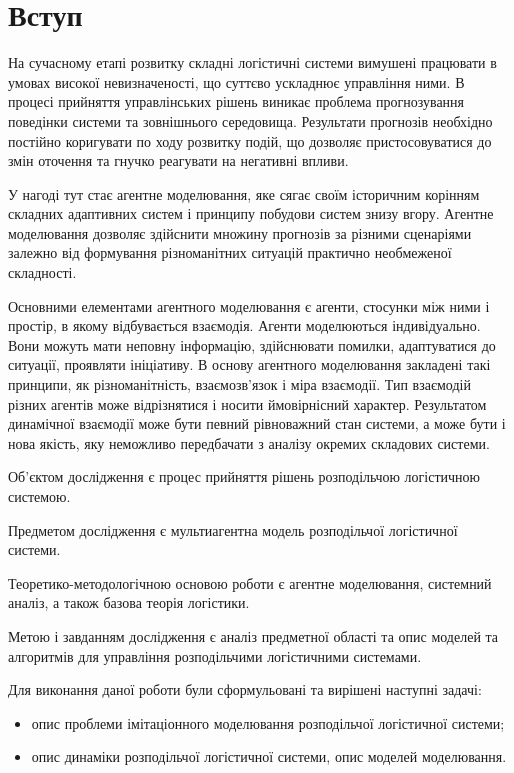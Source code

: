 \section*{Вступ}


На сучасному етапі розвитку складні логістичні системи вимушені працювати в умовах високої невизначеності, що суттєво ускладнює управління ними. 
В процесі прийняття управлінських рішень виникає проблема прогнозування поведінки системи та зовнішнього середовища. 
Результати прогнозів необхідно постійно коригувати по ходу розвитку подій, що дозволяє пристосовуватися до змін оточення та гнучко реагувати на негативні впливи. 

У нагоді тут стає агентне моделювання, яке сягає своїм історичним корінням складних адаптивних систем і принципу побудови систем знизу вгору.
Агентне моделювання дозволяє здійснити множину прогнозів за різними сценаріями залежно від формування різноманітних ситуацій практично необмеженої складності. 

Основними елементами агентного моделювання є агенти, стосунки між ними і простір, в якому відбувається взаємодія. 
Агенти моделюються індивідуально. 
Вони можуть мати неповну інформацію, здійснювати помилки, адаптуватися до ситуації, проявляти ініціативу. 
В основу агентного моделювання закладені такі принципи, як різноманітність, взаємозв’язок і міра взаємодії. 
Тип взаємодій різних агентів може відрізнятися і носити ймовірнісний характер. 
Результатом динамічної взаємодії може бути певний рівноважний стан системи, а може бути і нова якість, яку неможливо передбачати з аналізу окремих складових системи.

Об'єктом дослідження є процес прийняття рішень розподільчою логістичною системою. 

Предметом дослідження є мультиагентна модель розподільчої логістичної системи. 

Теоретико-методологічною основою роботи є агентне моделювання, системний аналіз, а також базова теорія логістики.

Метою і завданням дослідження є аналіз предметної області та опис моделей та алгоритмів для управління розподільчими логістичними системами.

Для виконання даної роботи були сформульовані та вирішені наступні задачі:
\begin{itemize}
	\item опис проблеми імітаціонного моделювання розподільчої логістичної системи;
	\item опис динаміки розподільчої логістичної системи, опис моделей моделювання.
\end{itemize}
